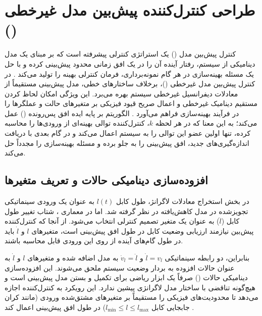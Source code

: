 
\section{طراحی کنترل‌کننده پیش‌بین مدل غیرخطی ()}
\label{sec:nmpc_design}

کنترل پیش‌بین مدل () یک استراتژی کنترلی پیشرفته است که بر مبنای یک مدل دینامیکی از سیستم، رفتار آینده آن را در یک افق زمانی محدود پیش‌بینی کرده و با حل یک مسئله بهینه‌سازی در هر گام نمونه‌برداری، فرمان کنترلی بهینه را تولید می‌کند \cite{Zak2017Introduction}. در کنترل پیش‌بین مدل غیرخطی ()، برخلاف ساختارهای خطی، مدل پیش‌بینی مستقیماً از معادلات دیفرانسیل غیرخطی سیستم بهره می‌برد. این ویژگی امکان لحاظ کردن مستقیم دینامیک غیرخطی و اعمال صریح قیود فیزیکی بر متغیرهای حالت و عملگرها را در فرآیند بهینه‌سازی فراهم می‌آورد \cite{Allgower2004Nonlinear}. الگوریتم  بر پایه ایده افق پس‌رونده () عمل می‌کند؛ به این معنا که در هر لحظه $k$، کنترل‌کننده توالی بهینه‌ای از ورودی‌ها را محاسبه کرده، تنها اولین عضو این توالی را به سیستم اعمال می‌کند و در گام بعدی با دریافت اندازه‌گیری‌های جدید، افق پیش‌بینی را به جلو برده و مسئله بهینه‌سازی را مجدداً حل می‌کند.

\subsection{افزوده‌سازی دینامیکی حالات و تعریف متغیرها}
در بخش استخراج معادلات لاگرانژ، طول کابل $l(t)$ به عنوان یک ورودی سینماتیکی تجویزشده در مدل کاهش‌یافته در نظر گرفته شد. اما در معماری ، شتاب تغییر طول کابل ($\ddot{l}$) به عنوان یک متغیر تصمیم کنترلی انتخاب می‌شود. از آنجا که کنترل‌کننده پیش‌بین نیازمند ارزیابی وضعیت کابل در طول افق پیش‌بینی است، متغیرهای $l$ و $\dot{l}$ باید در طول گام‌های آینده از روی این ورودی قابل محاسبه باشند.

بنابراین، دو رابطه سینماتیکی $\dot{l} = v_l$ و $\dot{v}_l = \ddot{l}$ به مدل اضافه شده و متغیرهای $l$ و $\dot{l}$ به عنوان حالات افزوده به بردار وضعیت سیستم ملحق می‌شوند. این افزوده‌سازی دینامیکی حالات () صرفاً یک ابزار ریاضی برای تکمیل و بستن مدل پیش‌بینی است و هیچ‌گونه تناقضی با ساختار مدل لاگرانژی پیشین ندارد. این رویکرد به کنترل‌کننده اجازه می‌دهد تا محدودیت‌های فیزیکی را مستقیماً بر متغیرهای مشتق‌شده ورودی (مانند کران جابجایی کابل $l_{\min} \le l \le l_{\max}$) در طول افق پیش‌بینی اعمال کند \cite{Homaeinezhad2026Solution, Allgower2004Nonlinear, Zak2017Introduction}.

